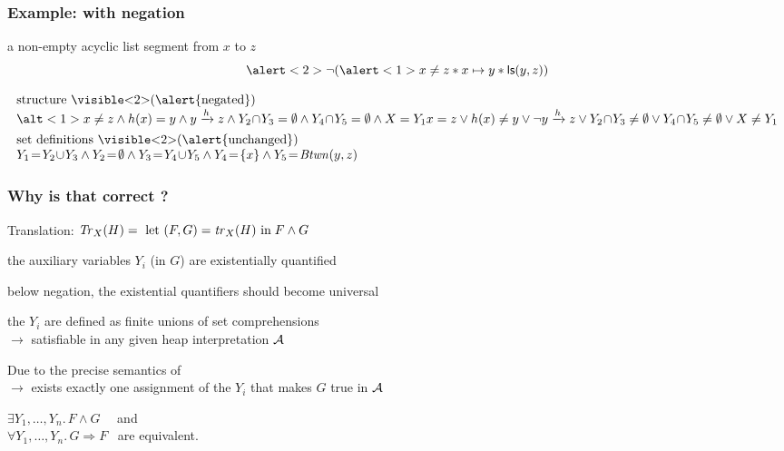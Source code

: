 \documentclass{beamer}
\begin{document}
\begin{frame}[2]
  \frametitle{Example: with negation}
a non-empty acyclic list segment from $x$ to $z$
\[ \alert<2>{\neg} ( \alert<1>{x \neq z* x \mapsto y * \liste{y}{z}} ) \]

\[
\begin{array}{l}
\text{structure \visible<2>{(\alert{negated})}}\\
\alt<1>{
x \neq z \land \edge(x)=y \land \reach{y}{z} \land
Y_2\!\cap\!Y_3 = \emptyset \land
Y_4\!\cap\!Y_5 = \emptyset \land
X = Y_1
}{
x = z \lor \edge(x) \neq y \lor \neg\reach{y}{z} \lor
Y_2\!\cap\!Y_3 \neq \emptyset \lor
Y_4\!\cap\!Y_5 \neq \emptyset \lor
X \neq Y_1
}\\[1ex]

\text{set definitions \visible<2>{(\alert{unchanged})}}\\
Y_1\!=\!Y_2\!\cup\!Y_3 \land
Y_2\!=\!\emptyset \land
Y_3\!=\!Y_4\!\cup\!Y_5 \land %
Y_4\!=\!\{x\} \land
Y_5\!=\!\Btwn(y,z)
\end{array}
\]
\end{frame}

\begin{frame}
  \frametitle{Why is that correct ?}
    
Translation: $\trfull{H}{X} = \ \letin{(F,G)}{\tr_X(H)} \; F \land G$

\vspace{2ex}

the auxiliary variables \alert{$Y_i$} (in $G$) \alert{are existentially quantified}

\vspace{1ex}

below negation, the existential quantifiers should become universal

\vspace{2ex}

the $Y_i$ are defined as finite unions of set comprehensions\\
$\rightarrow$ \alert{satisfiable in any given heap interpretation $\alg$}

\vspace{2ex}

Due to the precise semantics of \JoshLogic\\
$\rightarrow$ \alert{exists exactly one assignment of the $Y_i$} that makes $G$ true in $\alg$

\vspace{1ex}

$\exists Y_1,\dots,Y_n.\, F \land G$ \ \  and\\
$\forall Y_1,\dots,Y_n.\, G \Rightarrow F$ \ are equivalent. 

\end{frame}
\end{document}
